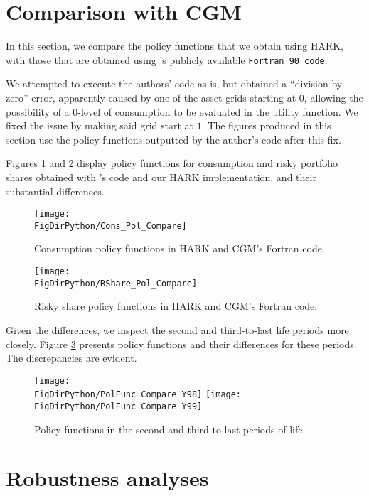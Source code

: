 \documentclass[../CGMPortfolio.tex]{subfiles}
\begin{document}
\section{Comparison with CGM}\label{sec:Comparison}

In this section, we compare the policy functions that we obtain using HARK, 
with those that are obtained using \cite{cgm2015}'s publicly available 
\href{http://faculty.london.edu/fgomes/cgmcode.ZIP}{\texttt{Fortran 90 code}}.

We attempted to execute the authors' code as-is, but obtained a ``division by zero'' error, apparently caused by one of the asset grids starting at $0$,
allowing the possibility of a $0$-level of consumption to be evaluated in the
utility function. We fixed the issue by making said grid start at $1$. The
figures produced in this section use the policy functions outputted by the
author's code after this fix. 

Figures \ref{fig:heatmapCons} and \ref{fig:heatmapRshare} display policy 
functions for consumption and risky portfolio shares obtained with 
\cite{cgm2015}'s code and our HARK implementation, and their substantial 
differences.

\begin{figure}[h]
	\texttt{[image: \\FigDirPython/Cons\_Pol\_Compare]}
	\caption{Consumption policy functions in HARK and CGM's Fortran 
	code.}\label{fig:heatmapCons}
\end{figure}

\begin{figure}[h]
	\texttt{[image: \\FigDirPython/RShare\_Pol\_Compare]}
	\caption{Risky share policy functions in HARK and CGM's Fortran code.}
	\label{fig:heatmapRshare}
\end{figure}

Given the differences, we inspect the second and third-to-last life periods more closely. Figure \ref{fig:pol_funcs_last} presents policy functions and their differences for these periods. The discrepancies are evident.

\begin{figure}[h]
	\texttt{[image: \\FigDirPython/PolFunc\_Compare\_Y98]}
	\texttt{[image: \\FigDirPython/PolFunc\_Compare\_Y99]}
	\caption{Policy functions in the second and third to last periods of life.}
	\label{fig:pol_funcs_last}
\end{figure}


\section{Robustness analyses}\label{sec:Sensitivity}
\end{document}
